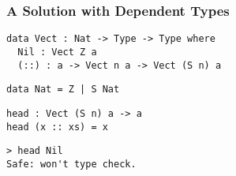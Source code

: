 \begin{frame}[fragile]
\frametitle{A Solution with Dependent Types}

\begin{lstlisting}[frame=single]
data Vect : Nat -> Type -> Type where
  Nil : Vect Z a
  (::) : a -> Vect n a -> Vect (S n) a
\end{lstlisting}

\begin{lstlisting}[frame=single]
data Nat = Z | S Nat
\end{lstlisting}

\begin{lstlisting}[frame=single]
head : Vect (S n) a -> a
head (x :: xs) = x
\end{lstlisting}

\begin{lstlisting}[frame=single]
> head Nil
Safe: won't type check.
\end{lstlisting}

\end{frame}
